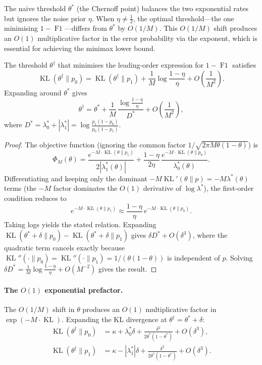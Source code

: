 The naive threshold $\theta^*$ (the Chernoff point) balances the two
exponential rates but ignores the noise prior $\eta$.  When $\eta\neq\frac12$,
the optimal threshold---the one minimising $1-\operatorname{F1}$---differs
from $\theta^*$ by $O(1/M)$.  This $O(1/M)$ shift produces an $O(1)$
multiplicative factor in the error probability via the exponent, which is
essential for achieving the minimax lower bound.

\begin{lemma}
  \label{lem:adaptive_threshold}
  The threshold $\theta^\dagger$ that minimises the leading-order expression
  for $1-\operatorname{F1}$ satisfies
  \[
  \operatorname{KL}(\theta^\dagger\|p_0)
  = \operatorname{KL}(\theta^\dagger\|p_1)
    + \frac1M\log\frac{1-\eta}{\eta}
    + O\!\left(\frac1{M^2}\right).
  \]
  Expanding around $\theta^*$ gives
  \[
  \theta^\dagger = \theta^*
    + \frac1M\,\frac{\log\frac{1-\eta}{\eta}}{D^*}
    + O\!\left(\frac1{M^2}\right),
  \]
  where $D^*=\lambda_0^*+|\lambda_1^*|
          =\log\frac{p_1(1-p_0)}{p_0(1-p_1)}$.
\end{lemma}

\begin{proof}
  The objective function (ignoring the common factor
  $1/\sqrt{2\pi M\theta(1-\theta)}$) is
  \[
  \Phi_M(\theta)
  = \frac{e^{-M\cdot\operatorname{KL}(\theta\|p_1)}}{2|\lambda_1^*(\theta)|}
    + \frac{1-\eta}{2\eta}\,
      \frac{e^{-M\cdot\operatorname{KL}(\theta\|p_0)}}{\lambda_0^*(\theta)}.
  \]
  Differentiating and keeping only the dominant
  $-M\operatorname{KL}'(\theta\|p)=-M\lambda^*(\theta)$ terms (the
  $-M$ factor dominates the $O(1)$ derivative of $\log\lambda^*$),
  the first-order condition reduces to
  \[
  e^{-M\cdot\operatorname{KL}(\theta\|p_1)}
  \approx \frac{1-\eta}{\eta}\,
          e^{-M\cdot\operatorname{KL}(\theta\|p_0)}.
  \]
  Taking logs yields the stated relation.  Expanding
  $\operatorname{KL}(\theta^*+\delta\|p_0)-\operatorname{KL}(\theta^*+\delta\|p_1)$
  gives $\delta D^* + O(\delta^3)$, where the quadratic term cancels exactly
  because $\operatorname{KL}''(\cdot\|p_0)=\operatorname{KL}''(\cdot\|p_1)
  =1/(\theta(1-\theta))$ is independent of $p$.  Solving $\delta D^* =
  \frac1M\log\frac{1-\eta}{\eta}+O(M^{-2})$ gives the result.
\end{proof}

\paragraph{The $O(1)$ exponential prefactor.}
The $O(1/M)$ shift in $\theta$ produces an $O(1)$ multiplicative factor in
$\exp(-M\cdot\operatorname{KL})$.  Expanding the KL divergence at
$\theta^\dagger=\theta^*+\delta$:
\[
\begin{aligned}
\operatorname{KL}(\theta^\dagger\|p_0)
&= \kappa + \lambda_0^*\delta
   + \frac{\delta^2}{2\theta^*(1-\theta^*)} + O(\delta^3),\\[4pt]
\operatorname{KL}(\theta^\dagger\|p_1)
&= \kappa - |\lambda_1^*|\delta
   + \frac{\delta^2}{2\theta^*(1-\theta^*)} + O(\delta^3).
\end{aligned}
\]

